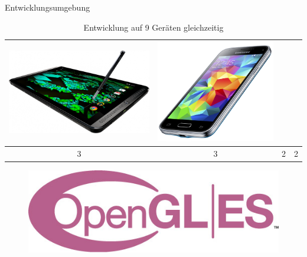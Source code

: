 \begin{frame}{Entwicklungsumgebung}
{\begin{table}[h]
\begin{tabular}{c|c|c|c}
		\includegraphics[width=\textwidth, height=0.1\textheight, keepaspectratio]{images/tablets} & 
		\includegraphics[width=\textwidth, height=0.1\textheight, keepaspectratio]{images/smartphones} \\ \hline
		3 & 3 & 2 & 2
	\end{tabular}
	\caption{Entwicklung auf 9 Geräten gleichzeitig}
	\end{table}
}
{
	\begin{figure}
		\centering
		\includegraphics[width=\textwidth, height=0.18\textheight, keepaspectratio]{images/opengl_es_logo}

\end{figure}}
\end{frame}
